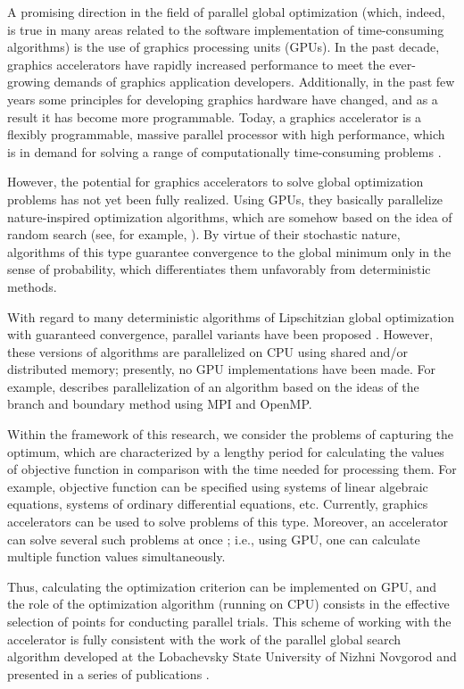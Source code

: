 \documentclass{svproc}
\begin{document}
A promising direction in the field of parallel global optimization (which, indeed, is true in many areas related to the software implementation of time-consuming algorithms) is the use of graphics processing units (GPUs). In the past decade, graphics accelerators have rapidly increased performance to meet the ever-growing demands of graphics application developers. Additionally, in the past few years some principles for developing graphics hardware have changed, and as a result it has become more programmable. Today, a graphics accelerator is a flexibly programmable, massive parallel processor with high performance, which is in demand for solving a range of computationally time-consuming problems \cite{Hwu2011}.

However, the potential for graphics accelerators to solve global optimization problems has not yet been fully realized. Using  GPUs, they basically parallelize nature-inspired optimization algorithms, which are somehow based on the idea of random search (see, for example, \cite{Ferreiro2013,Garcia2014,Langdon2011}). By virtue of their stochastic nature, algorithms of this type guarantee convergence to the global minimum only in the sense of probability, which differentiates them unfavorably from deterministic methods.

With regard to many deterministic algorithms of Lipschitzian global optimization with guaranteed convergence, parallel variants have been proposed \cite{Evtushenko2009,He2008,Paulavicius2011}. However, these versions of algorithms are parallelized on CPU using shared and/or distributed memory; presently, no GPU implementations have been made. For example, \cite{Paulavicius2011} describes parallelization of an algorithm based on the ideas of the branch and boundary method using MPI and OpenMP.

Within the framework of this research, we consider the problems of capturing the optimum, which are characterized by a lengthy period for calculating the values of objective function in comparison with the time needed for processing them. For example, objective function can be specified using systems of linear algebraic equations, systems of ordinary differential equations, etc. Currently, graphics accelerators can be used to solve problems of this type. Moreover, an accelerator can solve several such problems at once \cite{Kindratenko2014}; i.e., using GPU, one can calculate multiple function values simultaneously.

Thus, calculating the optimization criterion can be implemented on GPU, and the role of the optimization algorithm (running on CPU) consists in the effective selection of points for conducting parallel trials. This scheme of working with the accelerator is fully consistent with the work of the parallel global search algorithm developed at the Lobachevsky State University of Nizhni Novgorod and presented in a series of publications \cite{Barkalov2014,Barkalov2020,Barkalov2019,Grishagin2016,Grishagin2015,Grishagin2018,globalizerSystem}.
\end{document}
